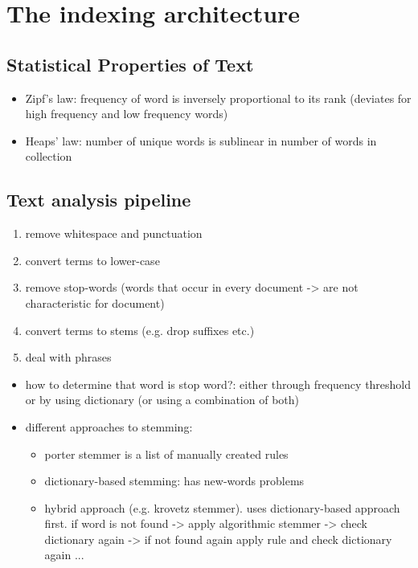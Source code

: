 \section{The indexing architecture}
\subsection{Statistical Properties of Text}
\begin{itemize}
    \item Zipf's law: frequency of word is inversely proportional to its rank (deviates for high frequency and low frequency words)
    \item Heaps' law: number of unique words is sublinear in number of words in collection
\end{itemize}
\subsection{Text analysis pipeline}
\begin{enumerate}
    \item remove whitespace and punctuation
    \item convert terms to lower-case
    \item remove stop-words (words that occur in every document -> are not characteristic for document)
    \item convert terms to stems (e.g. drop suffixes etc.)
    \item deal with phrases
\end{enumerate}
\begin{itemize}
    \item how to determine that word is stop word?: either through frequency threshold or by using dictionary (or using a combination of both)
    \item different approaches to stemming:
    \begin{itemize}
        \item porter stemmer is a list of manually created rules
        \item dictionary-based stemming: has new-words problems
        \item hybrid approach (e.g. krovetz stemmer). uses dictionary-based approach first. if word is not found -> apply algorithmic stemmer -> check dictionary again -> if not found again apply rule and check dictionary again ...
    \end{itemize}
\end{itemize}
